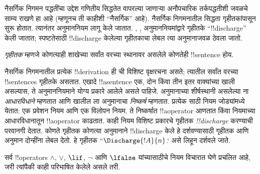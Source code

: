 \documentclass[../../../include/open-logic-section]{subfiles}
\begin{document}
      {}
      {}


\begin{explain}
नैसर्गिक निगमन पद्धतींचा उद्देश गणितीय सिद्धतेत वापरल्या जाणाऱ्या अनौपचारिक
तर्कपद्धतीशी जवळचे साम्य राखणे हा आहे (म्हणूनच ती काहीशी ``नैसर्गिक'' आहे).
नैसर्गिक निगमनातील सिद्धता गृहीतकांपासून सुरू होतात.
त्यानंतर अनुमाननियम लागू केले जातात. \Intro{\lnot}, \Intro{\lif},
 अनुमाननियमांद्वारे
गृहीतके ``!!{discharge}'' केली जातात; स्पष्टतेसाठी !!{discharge} केलेल्या
गृहीतकाचा लेबल त्या अनुमानाजवळ ठेवला जातो.
\end{explain}

\begin{defn}[गृहीतक]
\emph{गृहीतक} म्हणजे कोणत्याही शाखेच्या सर्वांत वरच्या स्थानावर असलेले
कोणतेही !!{sentence} होय.
\end{defn}

नैसर्गिक निगमनातील प्रत्येक !!{derivation} ही ची विशिष्ट वृक्षरचना असते;
त्यातील सर्वांत वरच्या !!{sentence}s गृहीतके असतात. एखादे !!a{sentence} एक,
दोन किंवा तीन इतर वाक्यांच्या खाली असल्यास, ते अनुमाननियमाने योग्य
प्रकारे आलेले असले पाहिजे. अनुमानाच्या शीर्षस्थानी असलेल्या ना
\emph{आधारविधाने} म्हणतात आणि खालील ला अनुमानाचा
\emph{निष्कर्ष} म्हणतात. प्रत्येक साठी नियम जोड्यांमध्ये येतात:
एक प्रवेशन नियम आणि एक विलोपन नियम. ते निष्कर्षात !!a{operator} आणतात
किंवा नियमाच्या आधारविधानातून !!a{operator} काढतात. काही नियम विशिष्ट
प्रकारचे गृहीतक \emph{!!{discharge}} करण्याची परवानगी देतात. कोणते
गृहीतक कोणत्या अनुमानाने !!{discharge} केले हे दर्शवण्यासाठी गृहीतक आणि
अनुमान दोन्हींना लेबल देतो. हे गृहीतक ``$\Discharge{!A}{n}$.` असे लिहून दर्शवले जाते.


%
	{सर्व !!{operator}s $\land$, $\lor$, $\lif$, $\lnot$ आणि $\lfalse$ यांच्यासाठीचे नियम विचारात घेणे प्रचलित आहे, जरी त्यांपैकी काही परिभाषित केलेले असले तरी.}
\end{document}
